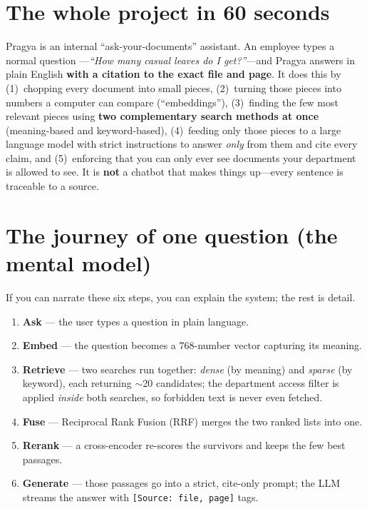 \documentclass[11pt,a4paper,oneside]{report}
\newcommand{\code}[1]{\texttt{#1}}
\begin{document}
\section{The whole project in 60 seconds}
Pragya is an internal ``ask-your-documents'' assistant. An employee types a normal question
---\emph{``How many casual leaves do I get?''}---and Pragya answers in plain English \textbf{with a
citation to the exact file and page}. It does this by (1)~chopping every document into small pieces,
(2)~turning those pieces into numbers a computer can compare (``embeddings''), (3)~finding the few most
relevant pieces using \textbf{two complementary search methods at once} (meaning-based and
keyword-based), (4)~feeding only those pieces to a large language model with strict instructions to
answer \emph{only} from them and cite every claim, and (5)~enforcing that you can only ever see
documents your department is allowed to see. It is \textbf{not} a chatbot that makes things up---every
sentence is traceable to a source.

\section{The journey of one question (the mental model)}
If you can narrate these six steps, you can explain the system; the rest is detail.
\begin{enumerate}
  \item \textbf{Ask} --- the user types a question in plain language.
  \item \textbf{Embed} --- the question becomes a 768-number vector capturing its meaning.
  \item \textbf{Retrieve} --- two searches run together: \emph{dense} (by meaning) and \emph{sparse} (by
  keyword), each returning $\sim$20 candidates; the department access filter is applied \emph{inside}
  both searches, so forbidden text is never even fetched.
  \item \textbf{Fuse} --- Reciprocal Rank Fusion (RRF) merges the two ranked lists into one.
  \item \textbf{Rerank} --- a cross-encoder re-scores the survivors and keeps the few best passages.
  \item \textbf{Generate} --- those passages go into a strict, cite-only prompt; the LLM streams the
  answer with \code{[Source: file, page]} tags.
\end{enumerate}
\end{document}
